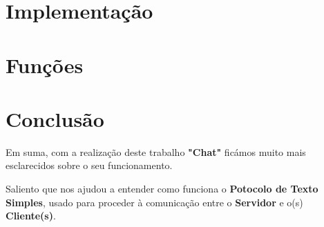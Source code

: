 \documentclass[11pt]{article}   %
\begin{document}
\section{Implementação}
\section{Funções}
\section{Conclusão} %
\hspace{0,5cm}Em suma, com a realização deste trabalho \textbf{"Chat"} ficámos muito 
mais esclarecidos sobre o seu funcionamento. \par
Saliento que nos ajudou a entender como funciona o \textbf{Potocolo de Texto Simples}, 
usado para proceder à comunicação entre o \textbf{Servidor} e o(s) \textbf{Cliente(s)}. 

\end{document}
